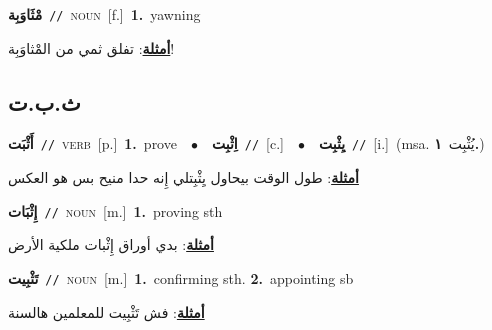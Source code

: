 \documentclass[10pt,a4paper,twoside]{article} %
\begin{document}
\begin{multicols}{2}
{\setlength\topsep{0pt}\textbf{\foreignlanguage{arabic}{مْثَاوَبِة}}\ {\color{gray}\texttt{//}\color{black}}\ \textsc{noun}\ [f.]\ \textbf{1.}~yawning\  \begin{flushright}\color{gray}\foreignlanguage{arabic}{\textbf{\underline{\foreignlanguage{arabic}{أمثلة}}}: تفلق ثمي من المْثاوَبِة!}\end{flushright}\color{black}} \vspace{2mm}

\vspace{-3mm}
\subsection*{\color{blue}\foreignlanguage{arabic}{ث.ب.ت}\color{blue}{}} 

{\setlength\topsep{0pt}\textbf{\foreignlanguage{arabic}{أَثْبَت}}\ {\color{gray}\texttt{//}\color{black}}\ \textsc{verb}\ [p.]\ \textbf{1.}~prove\ \ $\bullet$\ \ \setlength\topsep{0pt}\textbf{\foreignlanguage{arabic}{اِثْبِت}}\ {\color{gray}\texttt{//}\color{black}}\ [c.]\ \ $\bullet$\ \ \setlength\topsep{0pt}\textbf{\foreignlanguage{arabic}{يِثْبِت}}\ {\color{gray}\texttt{//}\color{black}}\ [i.]\ \color{gray}(msa. \foreignlanguage{arabic}{يُثْبِت}~\foreignlanguage{arabic}{\textbf{١.}})\color{black}\  \begin{flushright}\color{gray}\foreignlanguage{arabic}{\textbf{\underline{\foreignlanguage{arabic}{أمثلة}}}: طول الوقت بيحاول يِثْبِتلي إِنه حدا منيح بس هو العكس}\end{flushright}\color{black}} \vspace{2mm}

{\setlength\topsep{0pt}\textbf{\foreignlanguage{arabic}{إِثْبَات}}\ {\color{gray}\texttt{//}\color{black}}\ \textsc{noun}\ [m.]\ \textbf{1.}~proving sth\  \begin{flushright}\color{gray}\foreignlanguage{arabic}{\textbf{\underline{\foreignlanguage{arabic}{أمثلة}}}: بدي أوراق إِثْبات ملكية الأرض}\end{flushright}\color{black}} \vspace{2mm}

{\setlength\topsep{0pt}\textbf{\foreignlanguage{arabic}{تَثْبِيت}}\ {\color{gray}\texttt{//}\color{black}}\ \textsc{noun}\ [m.]\ \textbf{1.}~confirming sth.  \textbf{2.}~appointing sb\  \begin{flushright}\color{gray}\foreignlanguage{arabic}{\textbf{\underline{\foreignlanguage{arabic}{أمثلة}}}: فش تَثْبِيت للمعلمين هالسنة}\end{flushright}\color{black}} \vspace{2mm}


\end{multicols}
\end{document}
